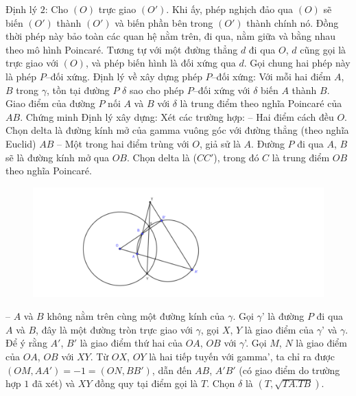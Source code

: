 \begin{multicols}{2}
	\vskip 0.1cm
	Định lý $2$: Cho $(O)$ trực giao $(O')$. Khi ấy, phép nghịch đảo qua $(O)$ sẽ biến $(O')$ thành $(O')$ và biến phần bên trong $(O')$ thành chính nó. Đồng thời phép này bảo toàn các quan hệ nằm trên, đi qua, nằm giữa và bằng nhau theo mô hình Poincaré. Tương tự với một đường thẳng $d$ đi qua $O$, $d$ cũng gọi là trực giao với $(O)$, và phép biến hình là đối xứng qua $d$. Gọi chung hai phép này là phép $P$--đối xứng.
	\vskip 0.1cm
	Định lý về xây dựng phép $P$--đối xứng: Với mỗi hai điểm $A$, $B$ trong $\gamma$, tồn tại đường $P$ $\delta$ sao cho phép $P$--đối xứng với $\delta$ biến $A$ thành $B$. Giao điểm của đường $P$ nối $A$ và $B$ với $\delta$ là trung điểm theo nghĩa Poincaré của $AB$.
	\vskip 0.1cm
	Chứng minh Định lý xây dựng: Xét các trường hợp:
	\vskip 0.1cm
	-- Hai điểm cách đều $O$. Chọn delta là đường kính mở của gamma vuông góc với đường thẳng (theo nghĩa Euclid) $AB$
	\vskip 0.1cm
	-- Một trong hai điểm trùng với $O$, giả sử là $A$. Đường $P$ đi qua $A$, $B$ sẽ là đường kính mở qua $OB$. Chọn delta là ($CC'$), trong đó $C$ là trung điểm $OB$ theo nghĩa Poincaré. 
	\begin{figure}[H]
		\vspace*{-5pt}
		\centering
		\captionsetup{labelformat= empty, justification=centering}
		\includegraphics[width= 1\linewidth]{TH 3 định lý xây dựng.pdf}
		\vspace*{-10pt}
	\end{figure}
	-- $A$ và $B$ không nằm trên cùng một đường kính của $\gamma$. Gọi $\gamma$' là đường $P$ đi qua $A$ và $B$, đây là một đường tròn trực giao với $\gamma$, gọi $X$, $Y$ là giao điểm của $\gamma$' và $\gamma$. Để ý rằng $A'$, $B'$ là giao điểm thứ hai của $OA$, $OB$ với $\gamma$'. Gọi $M$, $N$ là giao điểm của $OA$, $OB$ với $XY$. Từ $OX$, $OY$ là hai tiếp tuyến với gamma', ta chỉ ra được $(OM, AA') = -1 = (ON, BB')$, dẫn đến $AB$, $A'B'$ (có giao điểm do trường hợp $1$ đã xét) và $XY$ đồng quy tại điểm gọi là $T$. Chọn $\delta$ là $(T, \sqrt{TA.TB})$. 
	\begin{figure}[H]

\end{figure}
\end{multicols}
